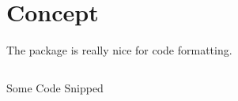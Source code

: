 \chapter{Concept}\label{ch:concept}

The  package is really nice for code formatting.

\begin{listing}[h]
	\inputminted{ruby}{listings/context-data-transform.rb}
	\caption{Some Code Snipped}
	\label{lst:code-snipped}
\end{listing}
